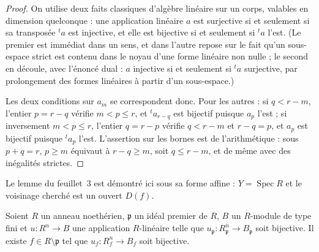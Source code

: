 \begin{proof}
On utilise deux faits classiques d'algèbre linéaire sur un corps, valables en dimension quelconque : une application linéaire $a$ est surjective si et seulement si sa transposée ${}^t a$ est injective, et elle est bijective si et seulement si ${}^t a$ l'est. (Le premier est immédiat dans un sens, et dans l'autre repose sur le fait qu'un sous-espace strict est contenu dans le noyau d'une forme linéaire non nulle ; le second en découle, avec l'énoncé dual : $a$ injective si et seulement si ${}^t a$ surjective, par prolongement des formes linéaires à partir d'un sous-espace.)

Les deux conditions sur $a_m$ se correspondent donc. Pour les autres : si $q < r - m$, l'entier $p = r - q$ vérifie $m < p \leqslant r$, et ${}^t a_{r-q}$ est bijectif puisque $a_p$ l'est ; si inversement $m < p \leqslant r$, l'entier $q = r - p$ vérifie $q < r - m$ et $r - q = p$, et $a_p$ est bijectif puisque ${}^t a_p$ l'est. L'assertion sur les bornes est de l'arithmétique : sous $p + q = r$, $p \geqslant m$ équivaut à $r - q \geqslant m$, soit $q \leqslant r - m$, et de même avec des inégalités strictes.
\end{proof}

Le lemme du feuillet~3 est démontré ici sous sa forme affine : $Y = \operatorname{Spec} R$ et le voisinage cherché est un ouvert $D(f)$.

\begin{enonce}
Soient $R$ un anneau noethérien, $\mathfrak p$ un idéal premier de $R$, $B$ un $R$-module de type fini et $u : R^n \to B$ une application $R$-linéaire telle que $u_{\mathfrak p} : R^n_{\mathfrak p} \to B_{\mathfrak p}$ soit bijective. Il existe $f \in R \setminus \mathfrak p$ tel que $u_f : R^n_f \to B_f$ soit bijective.
\end{enonce}

